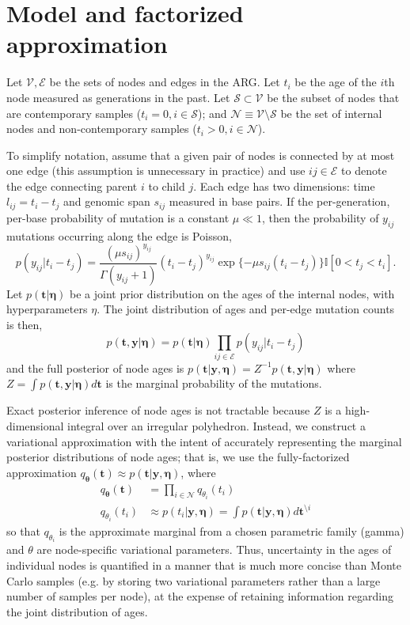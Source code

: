 \documentclass{article}
\begin{document}
\section{Model and factorized approximation}

Let $\mathcal{V}, \mathcal{E}$ be the sets of nodes and edges in the ARG. Let $t_i$ be the age of the $i$th node measured as generations in the past. Let $\mathcal{S} \subset \mathcal{V}$ be the subset of nodes that are contemporary samples ($t_i = 0, i \in \mathcal{S}$); and $\mathcal{N} \equiv \mathcal{V} \setminus \mathcal{S}$ be the set of internal nodes and non-contemporary samples ($t_i > 0, i \in \mathcal{N}$). 

To simplify notation, assume that a given pair of nodes is connected by at most one edge (this assumption is unnecessary in practice) and use $ij \in \mathcal{E}$ to denote the edge connecting parent $i$ to child $j$. Each edge has two dimensions: time $l_{ij} = t_i - t_j$ and genomic span $s_{ij}$ measured in base pairs. If the per-generation, per-base probability of mutation is a constant $\mu \ll 1$, then the probability of $y_{ij}$ mutations occurring along the edge is Poisson, \[
p(y_{ij} | t_{i} - t_{j}) = \frac{(\mu s_{ij})^{y_{ij}}}{\Gamma(y_{ij} + 1)} (t_i - t_j)^{y_{ij}} \exp\{-\mu s_{ij} (t_i - t_j)\} \mathbb{I}[0 < t_j < t_i]. 
\]
Let $p(\bm t | \bm \eta)$ be a joint prior distribution on the ages of the internal nodes, with hyperparameters $\eta$. The joint distribution of ages and per-edge mutation counts is then,
\[
p(\bm t, \bm y | \bm \eta) = p(\bm t | \bm \eta) \prod_{ij \in \mathcal{E}} p(y_{ij} | t_i - t_j)
\]
and the full posterior of node ages is $p(\bm t | \bm y, \bm \eta) = Z^{-1} p(\bm t, \bm y | \bm \eta)$ where $Z = \int p(\bm t, \bm y | \bm \eta) d\bm t$ is the marginal probability of the mutations.

Exact posterior inference of node ages is not tractable because $Z$ is a high-dimensional integral over an irregular polyhedron. Instead, we construct a variational approximation with the intent of accurately representing the marginal posterior distributions of node ages; that is, we use the fully-factorized approximation $q_{\bm \theta}(\bm t) \approx p(\bm t | \bm y, \bm \eta)$, where
\[
\begin{aligned}
q_{\bm \theta}(\bm t) & = \prod_{i \in \mathcal{N}} q_{\theta_i}(t_i) \\
q_{\theta_i}(t_i) & \approx p(t_i | \bm y, \bm \eta) = \int p(\bm t | \bm y, \bm \eta) d\bm t^{\setminus i}
\end{aligned}
\]
so that $q_{\theta_i}$ is the approximate marginal from a chosen parametric family (gamma) and $\theta$ are node-specific variational parameters. Thus, uncertainty in the ages of individual nodes is quantified in a manner that is much more concise than Monte Carlo samples (e.g. by storing two variational parameters rather than a large number of samples per node), at the expense of retaining information regarding the joint distribution of ages.
\end{document}
